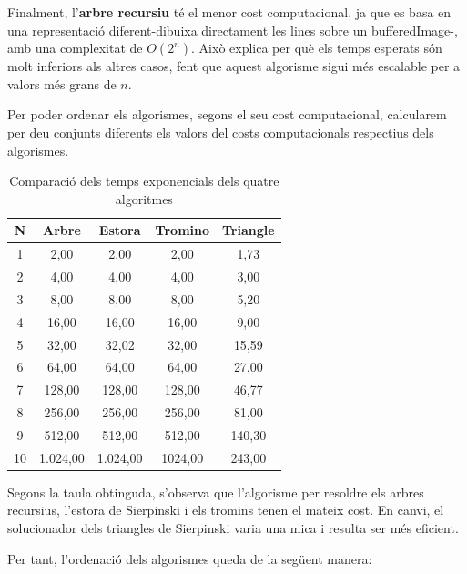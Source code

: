 \documentclass{ieeetj}
\begin{document}
Finalment, l'\textbf{arbre recursiu} té el menor cost computacional, ja que es basa en una representació diferent-dibuixa directament les lines sobre un bufferedImage-, amb una complexitat de \( O(2^n) \). Això explica per què els temps esperats són molt inferiors als altres casos, fent que aquest algorisme sigui més escalable per a valors més grans de \( n \).\newline

Per poder ordenar els algorismes, segons el seu cost computacional, calcularem per deu conjunts diferents els valors del costs computacionals respectius dels algorismes.

\begin{table}[h]
    \centering
    \begin{tabular}{|c|c|c|c|c|}
        \hline
        \textbf{N} & \textbf{Arbre} & \textbf{Estora} & \textbf{Tromino} & \textbf{Triangle} \\
        \hline
        1  & 2,00    & 2,00      &  2,00  & 1,73  \\
        2  & 4,00    & 4,00      &  4,00  & 3,00  \\
        3  & 8,00    & 8,00     &  8,00  & 5,20  \\
        4  & 16,00   & 16,00     & 16,00  & 9,00  \\
        5  & 32,00   & 32,02    & 32,00 & 15,59 \\
        6  & 64,00   & 64,00    & 64,00 & 27,00 \\
        7  & 128,00  & 128,00  & 128,00 & 46,77 \\
        8  & 256,00  & 256,00  & 256,00 & 81,00 \\
        9  & 512,00  & 512,00 & 512,00 & 140,30 \\
        10 & 1.024,00 & 1.024,00 & 1024,00 & 243,00 \\
        \hline
    \end{tabular}
    \vspace{5mm}
    \caption{Comparació dels temps exponencials dels quatre algoritmes}
    \label{tab:complexitat}
\end{table}

Segons la taula obtinguda, s'observa que l'algorisme per resoldre els arbres recursius, l'estora de Sierpinski i els tromins tenen el mateix cost. En canvi, el solucionador dels triangles de Sierpinski varia una mica i resulta ser més eficient.

Per tant, l'ordenació dels algorismes queda de la següent manera:
\end{document}
